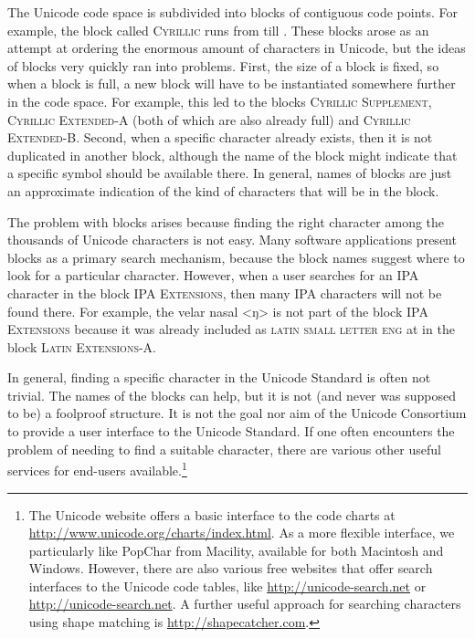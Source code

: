 The Unicode code space is subdivided into blocks of contiguous code points. For
example, the block called \textsc{Cyrillic} runs from  till
. These blocks arose as an attempt at ordering the enormous amount of
characters in Unicode, but the ideas of blocks very quickly ran into problems.
First, the size of a block is fixed, so when a block is full, a new block will
have to be instantiated somewhere further in the code space. For example, this
led to the blocks \textsc{Cyrillic Supplement}, \textsc{Cyrillic Extended-A}
(both of which are also already full) and \textsc{Cyrillic Extended-B}. Second,
when a specific character already exists, then it is not duplicated in another
block, although the name of the block might indicate that a specific symbol
should be available there. In general, names of blocks are just an approximate
indication of the kind of characters that will be in the block.

The problem with blocks arises because finding the right character among the
thousands of Unicode characters is not easy. Many software applications present
blocks as a primary search mechanism, because the block names suggest where to
look for a particular character. However, when a user searches for an IPA
character in the block \textsc{IPA Extensions}, then many IPA characters will not
be found there. For example, the velar nasal <ŋ> is not part of the block
\textsc{IPA Extensions} because it was already included as \textsc{latin small letter
eng} at  in the block \textsc{Latin Extensions-A}.

In general, finding a specific character in the Unicode Standard is often not
trivial. The names of the blocks can help, but it is not (and never was supposed
to be) a foolproof structure. It is not the goal nor aim of the Unicode
Consortium to provide a user interface to the Unicode Standard. If one often
encounters the problem of needing to find a suitable character, there are
various other useful services for end-users available.\footnote{The Unicode
website offers a basic interface to the code charts at
\url{http://www.unicode.org/charts/index.html}. As a more flexible interface, we
particularly like PopChar from Macility, available for both Macintosh and
Windows. However, there are also various free websites that offer search interfaces
to the Unicode code tables, like \url{http://unicode-search.net} or
\url{http://unicode-search.net}. A further useful approach for searching characters
using shape matching is \url{http://shapecatcher.com}.}

